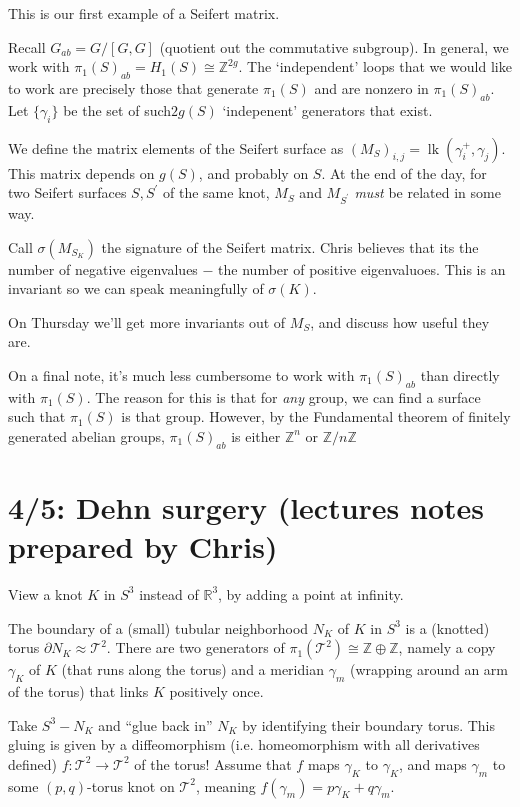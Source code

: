 \documentclass[11pt]{article}
\newcommand{\Z}{\mathbb{Z}}
\newcommand{\R}{\mathbb{R}}
\newcommand{\T}{\mathcal{T}}
\newcommand{\set}[1]{\{ #1 \}}
\DeclareMathOperator{\lk}{lk}
\theoremstyle{plain}
\theoremstyle{definition}
\begin{document}
This is our first example of a Seifert matrix.

Recall $G_{ab} = G / [G, G]$ (quotient out the commutative subgroup). In general, we work with $\pi_1{(S)}_{ab} = H_1(S) \cong \Z^{2g}$. The `independent' loops that we would like to work are precisely those that generate $\pi_1(S)$ and
are nonzero in $\pi_1{(S)}_{ab}$. Let $\set{\gamma_i}$ be the set of such$2g(S)$ `indepenent' generators that exist.

We define the matrix elements of the Seifert surface as ${(M_S)}_{i,j} = \lk(\gamma_i^+, \gamma_j)$. This matrix depends on $g(S)$, and probably on $S$. At the end of the day, for two Seifert surfaces $S, S^\prime$ of the same knot,
$M_S$ and $M_{S^\prime}$ \emph{must} be related in some way.

Call $\sigma(M_{S_K})$ the signature of the Seifert matrix. Chris believes that its the number of negative eigenvalues $-$ the number of positive eigenvaluoes. This is an invariant so we can speak meaningfully of $\sigma(K)$.

On Thursday we'll get more invariants out of $M_S$, and discuss how useful they are.

On a final note, it's much less cumbersome to work with $\pi_1{(S)}_{ab}$ than directly with $\pi_1(S)$. The reason for this is that for \emph{any} group, we can find a surface such that $\pi_1(S)$ is that group. However,
by the Fundamental theorem of finitely generated abelian groups, $\pi_1(S)_{ab}$ is either $\Z^n$ or $\Z / n\Z$


\clearpage
\section{4/5: Dehn surgery (lectures notes prepared by Chris)}

View a knot $K$ in $S^3$ instead of $\R^3$, by adding a point at infinity.

The boundary of a (small) tubular neighborhood $N_K$ of $K$ in $S^3$ is a (knotted) torus $\partial N_K\approx\T^2$. There are two generators of $\pi_1(\T^2)\cong\Z\oplus\Z$, namely a copy $\gamma_K$ of $K$ (that runs along the torus) and a meridian $\gamma_m$ (wrapping around an arm of the torus) that links $K$ positively once.

Take $S^3-N_K$ and ``glue back in'' $N_K$ by identifying their boundary torus. This gluing is given by a diffeomorphism (i.e. homeomorphism with all derivatives defined) $f:\T^2\to\T^2$ of the torus! Assume that $f$ maps $\gamma_K$ to $\gamma_K$, and maps $\gamma_m$ to some $(p,q)$-torus knot on $\T^2$, meaning $f(\gamma_m)=p\gamma_K+q\gamma_m$.
\end{document}
